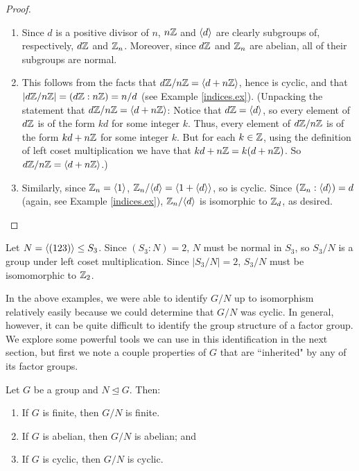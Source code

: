 \begin{proof}\

\begin{enumerate}
\item Since $d$ is a positive divisor of $n$, $n\mathbb{Z}$ and
$\langle d\rangle$ are clearly subgroups of, respectively, $d\mathbb{Z}$ and $\mathbb{Z}_n$.
Moreover, since $d\mathbb{Z}$ and $\mathbb{Z}_n$ are abelian, all of their subgroups
are normal.

\item This follows from the facts that $d\mathbb{Z}/n\mathbb{Z}=\langle d+n\mathbb{Z}\rangle$, hence
is cyclic, and that $|d\mathbb{Z}/n\mathbb{Z}|=(d\mathbb{Z}:n\mathbb{Z})=n/d$ (see Example
\ref{indices.ex}). (Unpacking the statement that
$d\mathbb{Z}/n\mathbb{Z}=\langle d+n\mathbb{Z}\rangle$: Notice that $d\mathbb{Z}=\langle d\rangle$, so every element of
$d\mathbb{Z}$ is of the form $kd$ for some integer $k$. Thus, every element
of $d\mathbb{Z}/n\mathbb{Z}$ is of the form $kd+n\mathbb{Z}$ for some integer $k$. But for
each $k\in \mathbb{Z}$, using the definition of left coset multiplication we
have that $kd+n\mathbb{Z}=k(d+n\mathbb{Z})$. So $d\mathbb{Z}/n\mathbb{Z}=\langle d+n\mathbb{Z}\rangle$.)

\item Similarly, since $\mathbb{Z}_n=\langle1\rangle$, $\mathbb{Z}_n/\langle d\rangle=\langle1+\langle d\rangle\rangle$, so
is cyclic. Since $(\mathbb{Z}_n:\langle d\rangle)=d$ (again, see Example
\ref{indices.ex}), $\mathbb{Z}_n/\langle d\rangle$ is isomorphic to $\mathbb{Z}_d$, as desired. \qedhere
\end{enumerate}
\end{proof}


\begin{example}{} Let $N=\langle(123)\rangle \leq S_3$.  Since $(S_3:N)=2$,
$N$ must be normal in $S_3$, so $S_3/N$ is a group under left coset
multiplication.  Since $|S_3/N|=2$, $S_3/N$ must be isomomorphic to
$\mathbb{Z}_2$. \end{example}

In the above examples, we were able to identify $G/N$ up to
isomorphism relatively easily because we could determine that $G/N$
was cyclic.  In general, however, it can be quite difficult to
identify the group structure of a factor group.  We explore some
powerful tools we can use in this identification in the next
section, but first we note a couple properties of $G$ that are
``inherited" by any of its factor groups.

\begin{thm}\label{} Let $G$ be a group and $N\unlhd G$. Then:
\begin{enumerate}\item If $G$ is finite, then $G/N$ is finite.

\item If $G$ is abelian, then $G/N$ is abelian; and

\item If $G$ is cyclic, then $G/N$ is cyclic.
\end{enumerate}
\end{thm}

